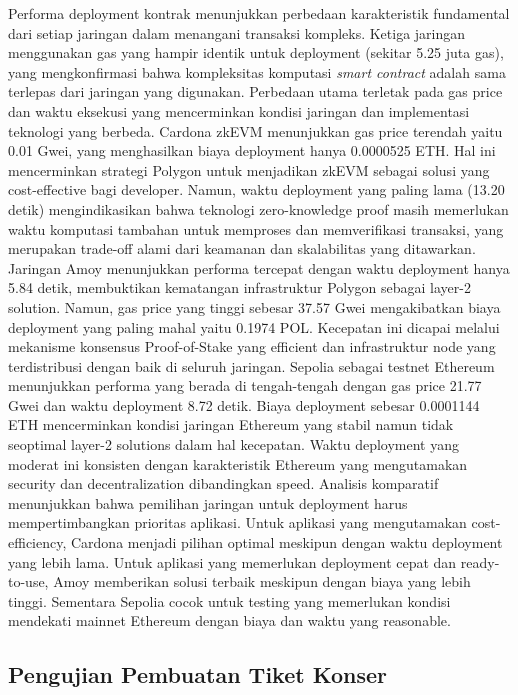Performa deployment kontrak menunjukkan perbedaan karakteristik fundamental
dari setiap jaringan dalam menangani transaksi kompleks. Ketiga jaringan
menggunakan gas yang hampir identik untuk deployment (sekitar 5.25 juta gas),
yang mengkonfirmasi bahwa kompleksitas komputasi \emph{smart contract} adalah
sama terlepas dari jaringan yang digunakan. Perbedaan utama terletak pada gas
price dan waktu eksekusi yang mencerminkan kondisi jaringan dan implementasi
teknologi yang berbeda. Cardona zkEVM menunjukkan gas price terendah yaitu 0.01
Gwei, yang menghasilkan biaya deployment hanya 0.0000525 ETH. Hal ini
mencerminkan strategi Polygon untuk menjadikan zkEVM sebagai solusi yang
cost-effective bagi developer. Namun, waktu deployment yang paling lama (13.20
detik) mengindikasikan bahwa teknologi zero-knowledge proof masih memerlukan
waktu komputasi tambahan untuk memproses dan memverifikasi transaksi, yang
merupakan trade-off alami dari keamanan dan skalabilitas yang ditawarkan.
Jaringan Amoy menunjukkan performa tercepat dengan waktu deployment hanya 5.84
detik, membuktikan kematangan infrastruktur Polygon sebagai layer-2 solution.
Namun, gas price yang tinggi sebesar 37.57 Gwei mengakibatkan biaya deployment
yang paling mahal yaitu 0.1974 POL. Kecepatan ini dicapai melalui mekanisme
konsensus Proof-of-Stake yang efficient dan infrastruktur node yang
terdistribusi dengan baik di seluruh jaringan. Sepolia sebagai testnet Ethereum
menunjukkan performa yang berada di tengah-tengah dengan gas price 21.77 Gwei
dan waktu deployment 8.72 detik. Biaya deployment sebesar 0.0001144 ETH
mencerminkan kondisi jaringan Ethereum yang stabil namun tidak seoptimal
layer-2 solutions dalam hal kecepatan. Waktu deployment yang moderat ini
konsisten dengan karakteristik Ethereum yang mengutamakan security dan
decentralization dibandingkan speed. Analisis komparatif menunjukkan bahwa
pemilihan jaringan untuk deployment harus mempertimbangkan prioritas aplikasi.
Untuk aplikasi yang mengutamakan cost-efficiency, Cardona menjadi pilihan
optimal meskipun dengan waktu deployment yang lebih lama. Untuk aplikasi yang
memerlukan deployment cepat dan ready-to-use, Amoy memberikan solusi terbaik
meskipun dengan biaya yang lebih tinggi. Sementara Sepolia cocok untuk testing
yang memerlukan kondisi mendekati mainnet Ethereum dengan biaya dan waktu yang
reasonable.

\subsection{Pengujian Pembuatan Tiket Konser}

